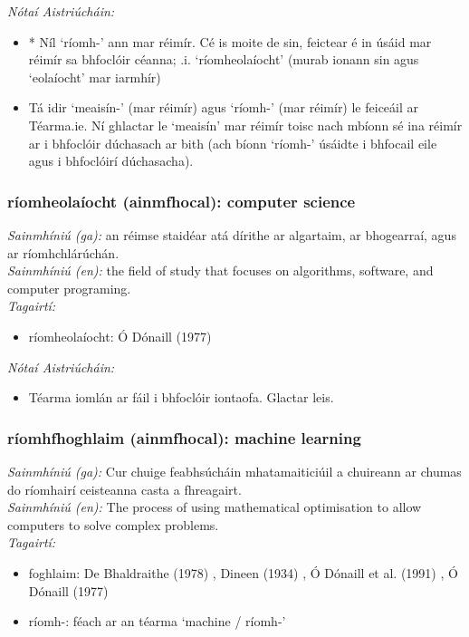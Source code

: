  \noindent \textit{Nótaí Aistriúcháin:}
\begin{itemize}
	\item * Níl `ríomh-' ann mar réimír. Cé is moite de sin, feictear é in úsáid mar réimír sa bhfoclóir céanna; .i. `ríomheolaíocht' (murab ionann sin agus `eolaíocht' mar iarmhír)
	\item Tá idir `meaisín-' (mar réimír) agus `ríomh-' (mar réimír) le feiceáil ar Téarma.ie. Ní ghlactar le `meaisín' mar réimír toisc nach mbíonn sé ina réimír ar i bhfoclóir dúchasach ar bith (ach bíonn `ríomh-' úsáidte i bhfocail eile agus i bhfoclóirí dúchasacha).
\end{itemize}


\subsubsection*{ríomheolaíocht (ainmfhocal): computer science}
 \noindent \textit{Sainmhíniú (ga):} an réimse staidéar atá dírithe ar algartaim, ar bhogearraí, agus ar ríomhchlárúchán.
\\
 \noindent \textit{Sainmhíniú (en):} the field of study that focuses on algorithms, software, and computer programing.
\\
 \noindent \textit{Tagairtí:}
\begin{itemize}
	\item ríomheolaíocht: Ó Dónaill (1977) \cite{odonaill}
\end{itemize}

 \noindent \textit{Nótaí Aistriúcháin:}
\begin{itemize}
	\item Téarma iomlán ar fáil i bhfoclóir iontaofa. Glactar leis.
\end{itemize}


\subsubsection*{ríomhfhoghlaim (ainmfhocal): machine learning}
 \noindent \textit{Sainmhíniú (ga):} Cur chuige feabhsúcháin mhatamaiticiúil a chuireann ar chumas do ríomhairí ceisteanna casta a fhreagairt.
\\
 \noindent \textit{Sainmhíniú (en):} The process of using mathematical optimisation to allow computers to solve complex problems.
\\
 \noindent \textit{Tagairtí:}
\begin{itemize}
	\item foghlaim: De Bhaldraithe (1978) \cite{de-bhaldraithe}, Dineen (1934) \cite{dineen}, Ó Dónaill et al. (1991) \cite{focloir-beag}, Ó Dónaill (1977) \cite{odonaill}
	\item ríomh-: féach ar an téarma `machine / ríomh-'
\end{itemize}

